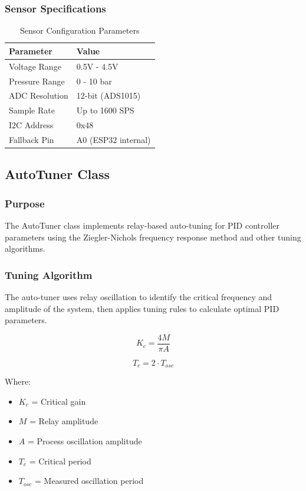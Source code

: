 \documentclass[12pt,a4paper]{article}
\begin{document}
\subsubsection{Sensor Specifications}
\begin{table}[H]
\centering
\begin{tabular}{@{}ll@{}}
\toprule
\textbf{Parameter} & \textbf{Value} \\
\midrule
Voltage Range & 0.5V - 4.5V \\
Pressure Range & 0 - 10 bar \\
ADC Resolution & 12-bit (ADS1015) \\
Sample Rate & Up to 1600 SPS \\
I2C Address & 0x48 \\
Fallback Pin & A0 (ESP32 internal) \\
\bottomrule
\end{tabular}
\caption{Sensor Configuration Parameters}
\end{table}

\subsection{AutoTuner Class}

\subsubsection{Purpose}
The AutoTuner class implements relay-based auto-tuning for PID controller parameters using the Ziegler-Nichols frequency response method and other tuning algorithms.

\subsubsection{Tuning Algorithm}
The auto-tuner uses relay oscillation to identify the critical frequency and amplitude of the system, then applies tuning rules to calculate optimal PID parameters.

\begin{equation}
K_c = \frac{4M}{\pi A}
\end{equation}

\begin{equation}
T_c = 2 \cdot T_{osc}
\end{equation}

Where:
\begin{itemize}
    \item $K_c$ = Critical gain
    \item $M$ = Relay amplitude  
    \item $A$ = Process oscillation amplitude
    \item $T_c$ = Critical period
    \item $T_{osc}$ = Measured oscillation period
\end{itemize}
\end{document}
